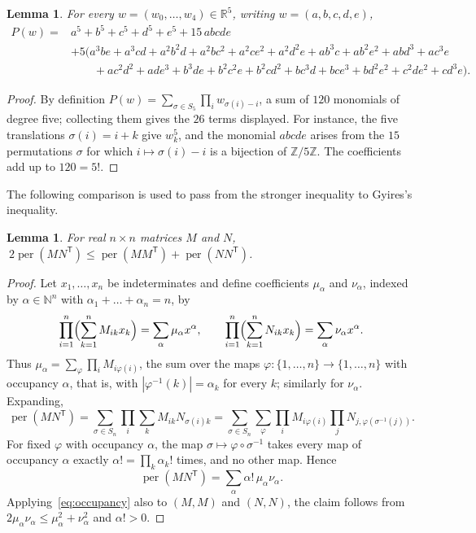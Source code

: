 \documentclass[11pt,a4paper]{article}
\newtheorem{lemma}[theorem]{Lemma}
\theoremstyle{definition}
\theoremstyle{remark}
\newcommand{\R}{\mathbb{R}}
\newcommand{\N}{\mathbb{N}}
\newcommand{\Z}{\mathbb{Z}}
\newcommand{\per}{\operatorname{per}}
\newcommand{\T}{\mathsf{T}}
\begin{document}
\begin{lemma}\label{lem:P}
For every $w=(w_0,\dots,w_4)\in\R^5$, writing $w=(a,b,c,d,e)$,
\begin{align*}
P(w)={}&a^5+b^5+c^5+d^5+e^5+15\,abcde\\
&+5\bigl(a^3be+a^3cd+a^2b^2d+a^2bc^2+a^2ce^2+a^2d^2e+ab^3c+ab^2e^2+abd^3+ac^3e\\
&\qquad+ac^2d^2+ade^3+b^3de+b^2c^2e+b^2cd^2+bc^3d+bce^3+bd^2e^2+c^2de^2+cd^3e\bigr).
\end{align*}
\end{lemma}

\begin{proof}
By definition $P(w)=\sum_{\sigma\in S_5}\prod_iw_{\sigma(i)-i}$, a sum of $120$ monomials of degree five; collecting
them gives the $26$ terms displayed. For instance, the five translations $\sigma(i)=i+k$ give $w_k^5$, and the monomial
$abcde$ arises from the $15$ permutations $\sigma$ for which $i\mapsto\sigma(i)-i$ is a bijection of $\Z/5\Z$. The
coefficients add up to $120=5!$.
\end{proof}

The following comparison is used to pass from the stronger inequality to Gyires's inequality.

\begin{lemma}\label{lem:gram}
For real $n\times n$ matrices $M$ and $N$, $\ 2\per(MN^\T)\le\per(MM^\T)+\per(NN^\T)$.
\end{lemma}

\begin{proof}
Let $x_1,\dots,x_n$ be indeterminates and define coefficients $\mu_\alpha$ and $\nu_\alpha$, indexed by
$\alpha\in\N^n$ with $\alpha_1+\dots+\alpha_n=n$, by
\[
\prod_{i=1}^n\Bigl(\sum_{k=1}^nM_{ik}x_k\Bigr)=\sum_\alpha \mu_\alpha x^\alpha,\qquad
\prod_{i=1}^n\Bigl(\sum_{k=1}^nN_{ik}x_k\Bigr)=\sum_\alpha \nu_\alpha x^\alpha .
\]
Thus $\mu_\alpha=\sum_\varphi\prod_iM_{i\varphi(i)}$, the sum over the maps $\varphi\colon\{1,\dots,n\}\to\{1,\dots,n\}$
with occupancy $\alpha$, that is, with $|\varphi^{-1}(k)|=\alpha_k$ for every $k$; similarly for $\nu_\alpha$. Expanding,
\[
\per(MN^\T)=\sum_{\sigma\in S_n}\prod_i\sum_kM_{ik}N_{\sigma(i)k}
=\sum_{\sigma\in S_n}\sum_\varphi\prod_iM_{i\varphi(i)}\prod_jN_{j,\varphi(\sigma^{-1}(j))}.
\]
For fixed $\varphi$ with occupancy $\alpha$, the map $\sigma\mapsto\varphi\circ\sigma^{-1}$ takes every map of
occupancy $\alpha$ exactly $\alpha!=\prod_k\alpha_k!$ times, and no other map. Hence
\begin{equation}\label{eq:occupancy}
\per(MN^\T)=\sum_\alpha\alpha!\,\mu_\alpha \nu_\alpha .
\end{equation}
Applying~\eqref{eq:occupancy} also to $(M,M)$ and $(N,N)$, the claim follows from $2\mu_\alpha\nu_\alpha\le
\mu_\alpha^2+\nu_\alpha^2$ and $\alpha!>0$.
\end{proof}
\end{document}
